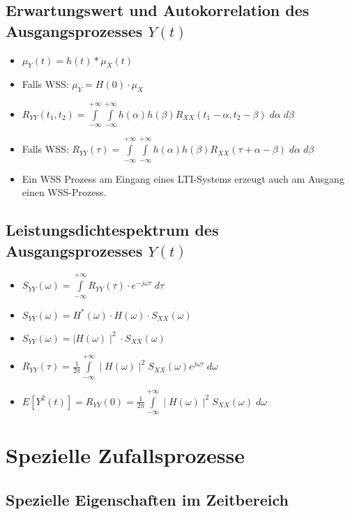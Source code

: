 \documentclass[10pt, a4paper]{article}
\begin{document}
\subsection{Erwartungswert und Autokorrelation des Ausgangsprozesses $Y(t)$}
\begin{itemize}
  \item            $\mu_{Y}(t) = h(t) \ast \mu_{X}(t)$  
  \item Falls WSS: $\mu_{Y} = H(0) \cdot \mu_{X}$  
  \item $R_{YY}(t_{1},t_{2}) = \int\limits_{-\infty}^{+\infty} \int\limits_{-\infty}^{+\infty}
                      h(\alpha) h(\beta)
                      R_{XX}(t_{1}-\alpha, t_{2}-\beta) \; d\alpha \; d\beta$
  \item Falls WSS: $R_{YY}(\tau) = \int\limits_{-\infty}^{+\infty} \int\limits_{-\infty}^{+\infty}
                      h(\alpha) h(\beta)
                      R_{XX}(\tau+\alpha-\beta) \; d\alpha \; d\beta$ 
  \item Ein WSS Prozess am Eingang eines LTI-Systems erzeugt auch am Ausgang einen WSS-Prozess.
\end{itemize} 


\subsection{Leistungsdichtespektrum des Ausgangsprozesses $Y(t)$}
\begin{itemize}
  \item $S_{YY}(\omega)= \int\limits_{-\infty}^{+\infty}
                            R_{YY}(\tau) \cdot e^{-j\omega\tau} \; d\tau$ 
  \item $S_{YY}(\omega)= H^{\ast}(\omega) \cdot H(\omega) \cdot S_{XX}(\omega)$ 
  \item $S_{YY}(\omega)= \mid\! H(\omega)\!\mid^{2} \cdot S_{XX}(\omega)$  
  \item $R_{YY}(\tau) = \frac{1}{2\pi} 
          \int\limits_{-\infty}^{+\infty} 
            \mid\! H(\omega)\!\mid^{2}S_{XX}(\omega)e^{j\omega\tau} \; d\omega$
  \item $E[Y^{2}(t)] = R_{YY}(0) = \frac{1}{2\pi} 
          \int\limits_{-\infty}^{+\infty} 
            \mid\! H(\omega)\!\mid^{2}S_{XX}(\omega) \; d\omega$
\end{itemize} 
\clearpage
\section{Spezielle Zufallsprozesse}
\subsection{Spezielle Eigenschaften im Zeitbereich}
\end{document}

